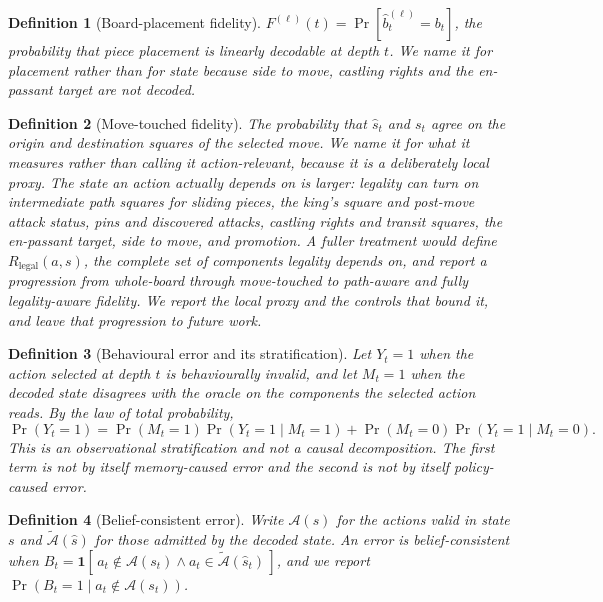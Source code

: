 \documentclass[manuscript, screen, review]{jair}
\newtheorem{jairdefinition}{Definition}
\theoremstyle{remark}
\newenvironment{definition}{\begin{jairdefinition}}{\end{jairdefinition}}
\begin{document}
\begin{definition}[Board-placement fidelity]
$F^{(\ell)}(t) = \Pr[\hat{b}_t^{(\ell)} = b_t]$, the probability that piece
placement is linearly decodable at depth $t$. We name it for placement rather
than for state because side to move, castling rights and the en-passant target
are not decoded.
\end{definition}

\begin{definition}[Move-touched fidelity]
The probability that $\hat{s}_t$ and $s_t$ agree on the origin and destination
squares of the selected move. We name it for what it measures rather than calling it action-relevant, because
it is a deliberately local proxy. The state an action
actually depends on is larger: legality can turn on intermediate path squares for
sliding pieces, the king's square and post-move attack status, pins and
discovered attacks, castling rights and transit squares, the en-passant target,
side to move, and promotion. A fuller treatment would define
$R_{\mathrm{legal}}(a, s)$, the complete set of components legality depends on,
and report a progression from whole-board through move-touched to path-aware and
fully legality-aware fidelity. We report the local proxy and the controls that
bound it, and leave that progression to future work.
\end{definition}

\begin{definition}[Behavioural error and its stratification]
Let $Y_t = 1$ when the action selected at depth $t$ is behaviourally invalid, and
let $M_t = 1$ when the decoded state disagrees with the oracle on the components
the selected action reads. By the law of total probability,
\[
\Pr(Y_t{=}1) = \Pr(M_t{=}1)\Pr(Y_t{=}1 \mid M_t{=}1)
             + \Pr(M_t{=}0)\Pr(Y_t{=}1 \mid M_t{=}0).
\]
This is an observational stratification and not a causal decomposition. The first
term is not by itself memory-caused error and the second is not by itself
policy-caused error.
\end{definition}

\begin{definition}[Belief-consistent error]
Write $\mathcal{A}(s)$ for the actions valid in state $s$ and
$\widetilde{\mathcal{A}}(\hat{s})$ for those admitted by the decoded state. An
error is \emph{belief-consistent} when
$B_t = \mathbf{1}[\,a_t \notin \mathcal{A}(s_t) \wedge a_t \in
\widetilde{\mathcal{A}}(\hat{s}_t)\,]$, and we report
$\Pr(B_t{=}1 \mid a_t \notin \mathcal{A}(s_t))$.
\end{definition}
\end{document}
